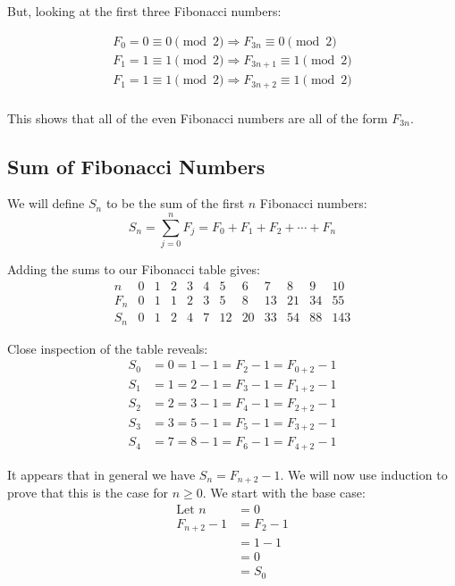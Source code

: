 \documentclass{article}
\begin{document}
But, looking at the first three Fibonacci numbers:

\[\begin{aligned}
    F_0 = 0 \equiv 0 \pmod 2 \Rightarrow F_{3n} \equiv 0 \pmod 2 \\
    F_1 = 1 \equiv 1 \pmod 2 \Rightarrow F_{3n+1} \equiv 1 \pmod 2 \\
    F_1 = 1 \equiv 1 \pmod 2 \Rightarrow F_{3n+2} \equiv 1 \pmod 2 \\
\end{aligned}\]

This shows that all of the even Fibonacci numbers are all of the form
\(F_{3n}\).

\subsection*{Sum of Fibonacci Numbers}
We will define \(S_n\) to be the sum of the first \(n\) Fibonacci numbers:
\[ S_n = \sum_{j=0}^n F_j = F_0 + F_1 + F_2 + \cdots + F_n \]

Adding the sums to our Fibonacci table gives:
\[\begin{array}{r|ccccccccccc}
    n & 0 & 1 & 2 & 3 & 4 & 5 & 6 & 7 & 8 & 9 & 10 \\
    \hline
    F_n & 0 & 1 & 1 & 2 & 3 & 5 & 8 & 13 & 21 & 34 & 55 \\
    \hline
    S_n & 0 & 1 & 2 & 4 & 7 & 12 & 20 & 33 & 54 & 88 & 143
\end{array}\]

Close inspection of the table reveals:
\[\begin{aligned}
    S_0 &= 0 = 1 - 1 = F_2 - 1 = F_{0+2} - 1 \\
    S_1 &= 1 = 2 - 1 = F_3 - 1 = F_{1+2} - 1 \\
    S_2 &= 2 = 3 - 1 = F_4 - 1 = F_{2+2} - 1 \\
    S_3 &= 3 = 5 - 1 = F_5 - 1 = F_{3+2} - 1 \\
    S_4 &= 7 = 8 - 1 = F_6 - 1 = F_{4+2} - 1
\end{aligned}\]

It appears that in general we have \(S_n=F_{n+2}-1\). We will now use induction
to prove that this is the case for \(n \geq 0\). We start with the base case:
\[\begin{aligned}
    \text{Let } n &= 0 \\
    F_{n+2} - 1 &= F_2 - 1 \\
    &= 1 - 1 \\
    &= 0 \\
    &= S_0
\end{aligned}\]
\end{document}

